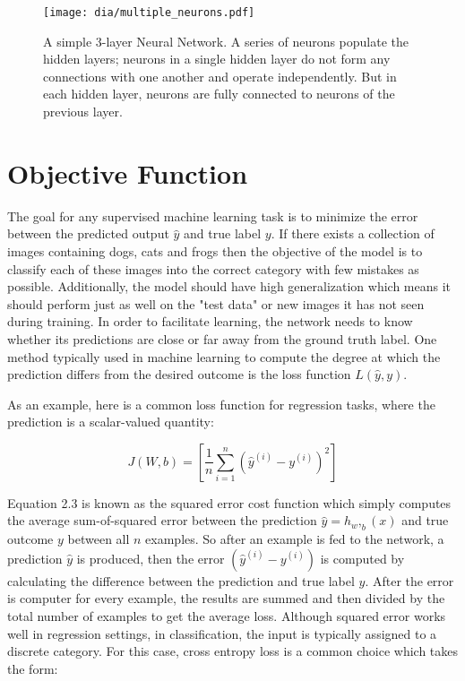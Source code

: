 \documentclass[12pt]{report}
\begin{document}
\begin{figure}[H]
\centering
\texttt{[image: dia/multiple\_neurons.pdf]}
\caption[A simple 3-layer Neural Network] {A simple 3-layer Neural Network. A series of neurons populate the hidden layers; neurons in a single hidden layer do not form any connections with one another and operate independently. But in each hidden layer, neurons are fully connected to neurons of the previous layer.}
\end{figure}


\section{Objective Function}

The goal for any supervised machine learning task is to minimize the error between the predicted output  $\hat{y}$ and true label $y$. If there exists a collection of images containing dogs, cats and frogs then the objective of the model is to classify each of these images into the correct category with few mistakes as possible. Additionally, the model should have high generalization which means it should perform just as well on the "test data" or new images it has not seen during training. In order to facilitate learning, the network needs to know whether its predictions are close or far away from the ground truth label. One method typically used in machine learning to compute the degree at which the prediction differs from the desired outcome is the loss function  $L(\hat{y},y)$.  

As an example, here is a common loss function for regression tasks, where the prediction is a scalar-valued quantity:

\begin{equation}
J(W, b) = [\frac{1}{n}\sum_{i=1}^{n}(\hat{y}^{(i)}-y^{(i)})^2]
\end{equation}


\noindent Equation 2.3 is known as the squared error cost function which simply computes the average sum-of-squared error between the prediction $\hat{y}=h_w,_b(x)$ and true outcome $y$ between all $n$ examples. So after an example is fed to the network, a prediction $\hat{y}$ is produced, then the error $(\hat{y}^{(i)}-y^{(i)})$ is computed by calculating the difference between the prediction and true label $y$. After the error is computer for every example, the results are summed and then divided by the total number of examples to get the average loss. Although squared error works well in regression settings, in classification, the input is typically assigned to a discrete category.  For this case, cross entropy loss is a common choice which takes the form:
\end{document}
